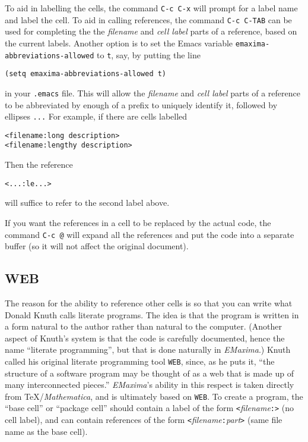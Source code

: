\documentclass{article}
\newcommand{\emx}{\textsl{\sffamily EMaxima}}
\begin{document}
To aid in labelling the cells, the command \texttt{C-c C-x}
will prompt for a label name and label the
cell.  To aid in calling references, the command \texttt{C-c C-TAB}
can be used for completing the
the \textsl{filename} and \textsl{cell label} parts of a reference, 
based on the current labels.  
Another option is to set the Emacs variable
\texttt{emaxima-abbreviations-allowed} to \texttt{t}, say, by putting
the line
\begin{verbatim}
(setq emaxima-abbreviations-allowed t)
\end{verbatim}
\noindent
in your \texttt{.emacs} file.  This will allow the \textsl{filename}
and \textsl{cell label} parts of a reference to be abbreviated by enough
of a prefix to uniquely identify it, followed by ellipses
\texttt{...}
For example, if there are cells labelled
\begin{verbatim}
<filename:long description>
<filename:lengthy description>
\end{verbatim}
\noindent
Then the reference
\begin{verbatim}
<...:le...>
\end{verbatim}
\noindent
will suffice to refer to the second label above.

If you want the references in a cell to be replaced by the actual
code, the command \texttt{C-c @} will expand all the
references and put the code into a separate buffer (so it will not
affect the original document).

\subsection{WEB}

\noindent
The reason for the ability to reference other cells is so that you can
write what Donald Knuth calls literate programs.  The idea is that the
program is written in a form natural to the author rather than natural
to the computer.  (Another aspect of Knuth's system is that the code
is carefully documented, hence the name ``literate programming'', but
that is done naturally in \emx{}.)  Knuth called his original
literate programming tool \texttt{WEB}, since, as he puts it,
``the structure of a software program may be thought of as a web that
is made up of many interconnected pieces.''  
\emx{}'s ability in this respect is taken directly from
\TeX{}/\textit{Mathematica}, and is ultimately based on
\texttt{WEB}. To create a 
program, the ``base cell'' or ``package cell'' should contain 
a label of the form \texttt{<}\textsl{filename}\texttt{:>} 
(no cell label), and can
contain references of the form 
\texttt{<}\textsl{filename}\texttt{:}\textsl{part}\texttt{>}
(same file name as the base cell).  
\end{document}
